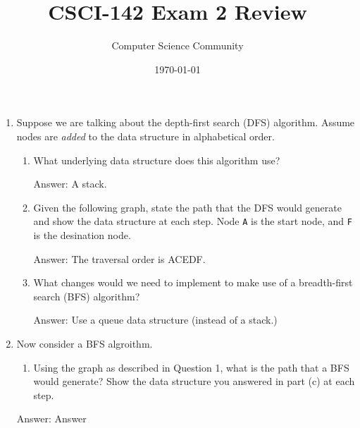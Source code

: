 \documentclass[11pt]{article}
\title{CSCI-142 Exam 2 Review}
\author{Computer Science Community}
\date{\today}
\newenvironment{answer}{\large\lstset{basicstyle=\large\ttfamily}\color{white} \small{Answer:}}{}
\newenvironment{answer}{\large\lstset{basicstyle=\large\ttfamily}\color{red} \small{Answer:}}{}
\begin{document}
\header
\begin{enumerate}


\item Suppose we are talking about the depth-first search (DFS) algorithm.
Assume nodes are \emph{added} to the data structure in alphabetical order.
\begin{enumerate}
\item What underlying data structure does this algorithm use?

\begin{answer}
A stack.
\end{answer}

\item %
Given the following graph, state the path that the DFS would generate and show the data structure at each step.
Node \texttt{A} is the start node, and \texttt{F} is the desination node.


\begin{answer}
The traversal order is ACEDF.
\end{answer}

\item %
What changes would we need to implement to make use of a breadth-first search (BFS) algorithm?

\begin{answer}
Use a queue data structure (instead of a stack.)
\end{answer}

\end{enumerate}

\item Now consider a BFS algroithm.
\begin{enumerate}
\item Using the graph as described in Question 1, what is the path that a BFS would generate?
Show the data structure you answered in part (c) at each step.
\end{enumerate}
\begin{answer}
Answer
\end{answer}



\end{enumerate}
\end{document}
